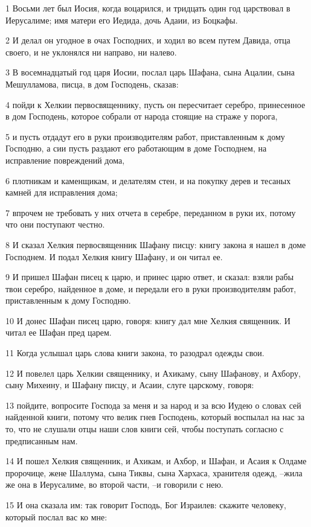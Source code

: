 \par 1 Восьми лет был Иосия, когда воцарился, и тридцать один год царствовал в Иерусалиме; имя матери его Иедида, дочь Адаии, из Боцкафы.
\par 2 И делал он угодное в очах Господних, и ходил во всем путем Давида, отца своего, и не уклонялся ни направо, ни налево.
\par 3 В восемнадцатый год царя Иосии, послал царь Шафана, сына Ацалии, сына Мешулламова, писца, в дом Господень, сказав:
\par 4 пойди к Хелкии первосвященнику, пусть он пересчитает серебро, принесенное в дом Господень, которое собрали от народа стоящие на страже у порога,
\par 5 и пусть отдадут его в руки производителям работ, приставленным к дому Господню, а сии пусть раздают его работающим в доме Господнем, на исправление повреждений дома,
\par 6 плотникам и каменщикам, и делателям стен, и на покупку дерев и тесаных камней для исправления дома;
\par 7 впрочем не требовать у них отчета в серебре, переданном в руки их, потому что они поступают честно.
\par 8 И сказал Хелкия первосвященник Шафану писцу: книгу закона я нашел в доме Господнем. И подал Хелкия книгу Шафану, и он читал ее.
\par 9 И пришел Шафан писец к царю, и принес царю ответ, и сказал: взяли рабы твои серебро, найденное в доме, и передали его в руки производителям работ, приставленным к дому Господню.
\par 10 И донес Шафан писец царю, говоря: книгу дал мне Хелкия священник. И читал ее Шафан пред царем.
\par 11 Когда услышал царь слова книги закона, то разодрал одежды свои.
\par 12 И повелел царь Хелкии священнику, и Ахикаму, сыну Шафанову, и Ахбору, сыну Михеину, и Шафану писцу, и Асаии, слуге царскому, говоря:
\par 13 пойдите, вопросите Господа за меня и за народ и за всю Иудею о словах сей найденной книги, потому что велик гнев Господень, который воспылал на нас за то, что не слушали отцы наши слов книги сей, чтобы поступать согласно с предписанным нам.
\par 14 И пошел Хелкия священник, и Ахикам, и Ахбор, и Шафан, и Асаия к Олдаме пророчице, жене Шаллума, сына Тиквы, сына Хархаса, хранителя одежд, --жила же она в Иерусалиме, во второй части, --и говорили с нею.
\par 15 И она сказала им: так говорит Господь, Бог Израилев: скажите человеку, который послал вас ко мне:
